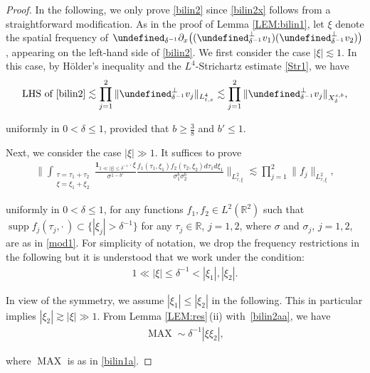 \documentclass[letterpaper, 11pt,  reqno]{amsart}
\DeclareMathOperator*{\intt}{\int}
\DeclareMathOperator*{\supp}{supp}
\DeclareMathOperator{\MAX}{MAX}
\newcommand{\1}{\hspace{0.5mm}\textup{I}\hspace{0.5mm}}
\newcommand{\noi}{\noindent}
\newcommand{\R}{\mathbb{R}}
\let\P= \undefined
\newcommand{\P}{\mathbf{P}}
\newcommand{\dl}{\delta}
\newcommand{\s}{\sigma}
\newcommand{\dx}{\partial_x}
\newcommand{\les}{\lesssim}
\newcommand{\ges}{\gtrsim}
\newcommand{\ind}{\mathbf 1}
\numberwithin{equation}{section}
\numberwithin{theorem}{section}
\begin{document}
\begin{proof} %
In the following, we only prove \eqref{bilin2}
since \eqref{bilin2x} follows from a straightforward modification.
%
%
As in the proof of Lemma \ref{LEM:bilin1}, 
let $\xi$ denote the spatial frequency 
of 
$ \P_{ \dl^{-1}}\dx\big( (\P_{ \dl^{-1}}^\perp v_1) (\P_{ \dl^{-1}}^\perp v_2)\big)$, 
appearing on the left-hand side of \eqref{bilin2}.
We first consider the case $|\xi |\les 1$.
In this case, by H\"older's inequality and  the $L^4$-Strichartz estimate \eqref{Str1}, we have
\begin{align*}
\text{LHS of \eqref{bilin2}}
\les \prod_{j = 1}^2 \| \P_{ \dl^{-1}}^\perp v_j\|_{L^4_{t, x}}
\les \prod_{j = 1}^2 \| \P_{ \dl^{-1}}^\perp v_j\|_{X^{s, b}_\dl}, 
\end{align*}

\noi
uniformly in $0 < \dl \le 1$, provided that
$b \ge \frac 38$
and 
 $b' \le 1$.


Next, we consider the case $|\xi|\gg 1$.
It suffices to prove %
\begin{align}
\bigg\|
\intt_{\substack{\tau = \tau_1 + \tau_2\\\xi= \xi_1 + \xi_2}}
\frac{\ind_{ 1\ll |\xi|\le  \dl^{-1}} \cdot \xi}{\s^{1-b'}}
\frac{ f_1(\tau_1, \xi_1)f_2(\tau_2, \xi_2) d\tau_1 d\xi_1}
{\s_1^{b}
\s_2^{b}}
\bigg\|_{L^2_{\tau, \xi}}
\les \prod_{j = 1}^2 \|f_j\|_{L^2_{\tau, \xi}}, 
\label{bilin2a}
\end{align}

\noi
uniformly in $0 < \dl \le1$, 
for any functions $f_1, f_2 \in L^2(\R^2)$
such that 
$\supp f_j(\tau_j, \cdot\,) \subset \{|\xi_j|>  \dl^{-1}\}$
for any $\tau_j \in \R$, $j = 1, 2$, 
where $\s$ and $\s_j$, $j = 1, 2$, 
are as in \eqref{mod1}.
For simplicity of notation, 
we drop the frequency restrictions in the following
but it is understood that we work under the condition: 
\begin{align}
1\ll |\xi|\le  \dl^{-1} < |\xi_1|, |\xi_2|.
\label{bilin2aa}
\end{align}


In view of the symmetry, we assume $|\xi_1|\le |\xi_2|$ in the following.
This in particular implies $|\xi_2|\ges |\xi |\gg 1$.
From Lemma \ref{LEM:res}\,(ii) with~\eqref{bilin2aa}, 
we have 
\begin{align}
\MAX  \sim \dl^{-1} |\xi \xi_2|, 
\label{bilin2b}
\end{align}

\noi
where $\MAX$ is as in \eqref{bilin1a}.



\end{proof}
\end{document}

